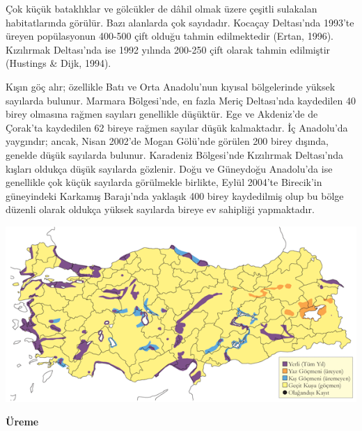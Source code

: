 \documentclass[
  a4paper,
  DIV=11,
  numbers=noendperiod]{scrreprt}
\begin{document}
Çok küçük bataklıklar ve gölcükler de dâhil olmak üzere çeşitli
sulakalan habitatlarında görülür. Bazı alanlarda çok sayıdadır. Kocaçay
Deltası'nda 1993'te üreyen popülasyonun 400-500 çift olduğu tahmin
edilmektedir (Ertan, 1996). Kızılırmak Deltası'nda ise 1992 yılında
200-250 çift olarak tahmin edilmiştir (Hustings \& Dijk, 1994).

Kışın göç alır; özellikle Batı ve Orta Anadolu'nun kıyısal bölgelerinde
yüksek sayılarda bulunur. Marmara Bölgesi'nde, en fazla Meriç
Deltası'nda kaydedilen 40 birey olmasına rağmen sayıları genellikle
düşüktür. Ege ve Akdeniz'de de Çorak'ta kaydedilen 62 bireye rağmen
sayılar düşük kalmaktadır. İç Anadolu'da yaygındır; ancak, Nisan 2002'de
Mogan Gölü'nde görülen 200 birey dışında, genelde düşük sayılarda
bulunur. Karadeniz Bölgesi'nde Kızılırmak Deltası'nda kışları oldukça
düşük sayılarda gözlenir. Doğu ve Güneydoğu Anadolu'da ise genellikle
çok küçük sayılarda görülmekle birlikte, Eylül 2004'te Birecik'in
güneyindeki Karkamış Barajı'nda yaklaşık 400 birey kaydedilmiş olup bu
bölge düzenli olarak oldukça yüksek sayılarda bireye ev sahipliği
yapmaktadır.

\includegraphics{images/harita_Page_122.png}

\textbf{Üreme}
\end{document}
